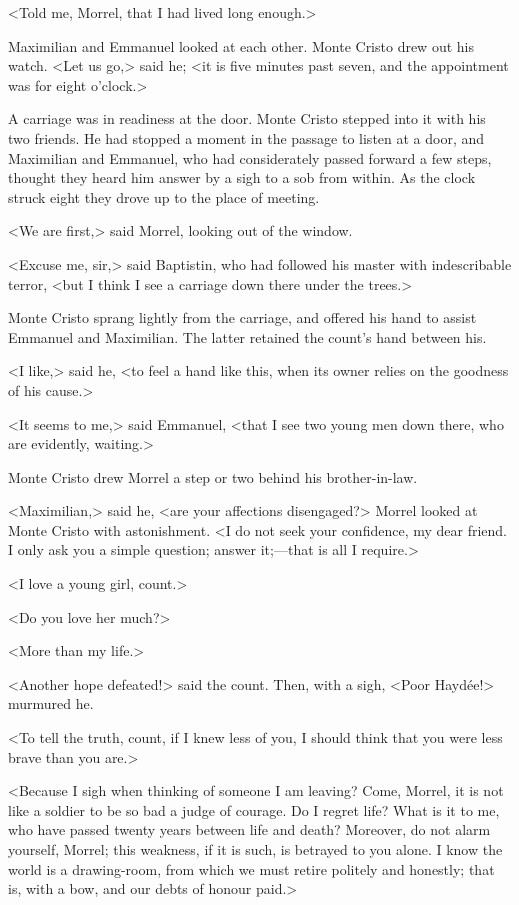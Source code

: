  <Told me, Morrel, that I had lived long enough.> 

 Maximilian and Emmanuel looked at each other. Monte Cristo drew out his watch. <Let us go,> said he; <it is five minutes past seven, and the appointment was for eight o'clock.> 

 A carriage was in readiness at the door. Monte Cristo stepped into it with his two friends. He had stopped a moment in the passage to listen at a door, and Maximilian and Emmanuel, who had considerately passed forward a few steps, thought they heard him answer by a sigh to a sob from within. As the clock struck eight they drove up to the place of meeting. 

 <We are first,> said Morrel, looking out of the window. 

 <Excuse me, sir,> said Baptistin, who had followed his master with indescribable terror, <but I think I see a carriage down there under the trees.> 

 Monte Cristo sprang lightly from the carriage, and offered his hand to assist Emmanuel and Maximilian. The latter retained the count's hand between his. 

 <I like,> said he, <to feel a hand like this, when its owner relies on the goodness of his cause.> 

 <It seems to me,> said Emmanuel, <that I see two young men down there, who are evidently, waiting.> 

 Monte Cristo drew Morrel a step or two behind his brother-in-law. 

 <Maximilian,> said he, <are your affections disengaged?> Morrel looked at Monte Cristo with astonishment. <I do not seek your confidence, my dear friend. I only ask you a simple question; answer it;—that is all I require.> 

 <I love a young girl, count.> 

 <Do you love her much?> 

 <More than my life.> 

 <Another hope defeated!> said the count. Then, with a sigh, <Poor Haydée!> murmured he. 

 <To tell the truth, count, if I knew less of you, I should think that you were less brave than you are.> 

 <Because I sigh when thinking of someone I am leaving? Come, Morrel, it is not like a soldier to be so bad a judge of courage. Do I regret life? What is it to me, who have passed twenty years between life and death? Moreover, do not alarm yourself, Morrel; this weakness, if it is such, is betrayed to you alone. I know the world is a drawing-room, from which we must retire politely and honestly; that is, with a bow, and our debts of honour paid.> 

